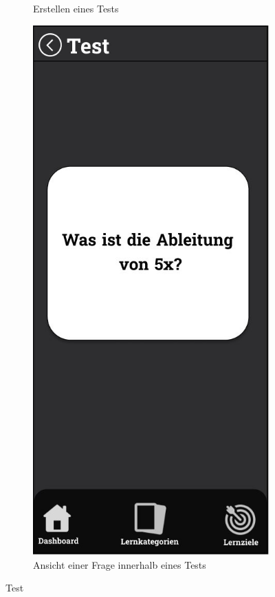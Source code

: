 \begin{figure}[htbp]
\begin{subfigure}[b]{0.45\linewidth}
    \caption{Erstellen eines Tests}
    \label{fig:test-erstellen}
  \end{subfigure}
  \hfill
  \begin{subfigure}[b]{0.45\linewidth}
    \centering
    \includegraphics[width=\linewidth]{images/Mockups/TestFrage.JPG}
    \caption{Ansicht einer Frage innerhalb eines Tests}
    \label{fig:test-frage}
  \end{subfigure}
  \caption{Test}
\end{figure}

